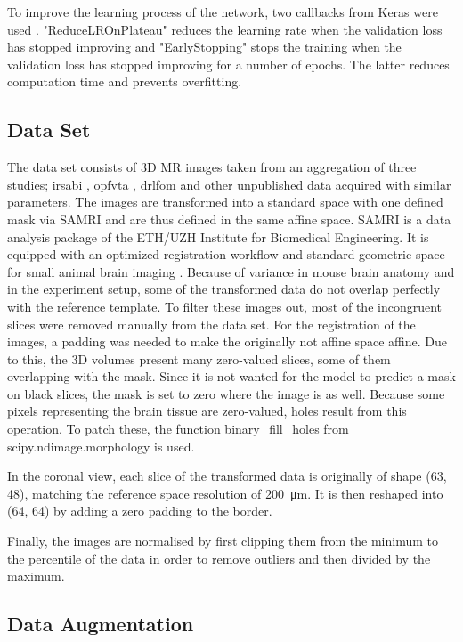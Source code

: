 \documentclass{article}
\begin{document}
To improve the learning process of the network, two callbacks from Keras were used \cite{noauthor_callbacks_nodate}. "ReduceLROnPlateau" reduces the learning rate when the validation loss has stopped improving and "EarlyStopping" stops the training when the validation loss has stopped improving for a number of epochs.
The latter reduces computation time and prevents overfitting.

\subsection{Data Set}
The data set consists of 3D MR images taken from an aggregation of three studies; irsabi , opfvta \cite{ioanas_whole-brain_nodate}, drlfom \cite{ioanas_effects_nodate} and other unpublished data acquired with similar parameters.  
The images are transformed into a standard space with one defined mask via SAMRI \cite{noauthor_ibt-fmi/samri_2019} and are thus defined in the same affine space.
SAMRI is a data analysis package of the ETH/UZH Institute for Biomedical Engineering.
It is equipped with an optimized registration workflow and standard geometric space for small animal brain imaging \cite{ioanas_optimized_2019}.
Because of variance in mouse brain anatomy and in the experiment setup, some of the transformed data do not overlap perfectly with the reference template.
To filter these images out, most of the incongruent slices were removed manually from the data set.
For the registration of the images, a padding was needed to make the originally not affine space affine. 
Due to this, the 3D volumes present many zero-valued slices, some of them overlapping with the mask.
Since it is not wanted for the model to predict a mask on black slices, the mask is set to zero where the image is as well.
Because some pixels representing the brain tissue are zero-valued, holes result from this operation.
To patch these, the function binary\_fill\_holes from scipy.ndimage.morphology \cite{noauthor_multi-dimensional_nodate} is used.

In the coronal view, each slice of the transformed data is originally of shape (63, 48), matching the reference space resolution of \SI{200}{\micro\metre}.
It is then reshaped into (64, 64) by adding a zero padding to the border.

Finally, the images are normalised by first clipping them from the minimum to the  percentile of the data in order to remove outliers and then divided by the maximum.

\subsection{Data Augmentation}
\end{document}
